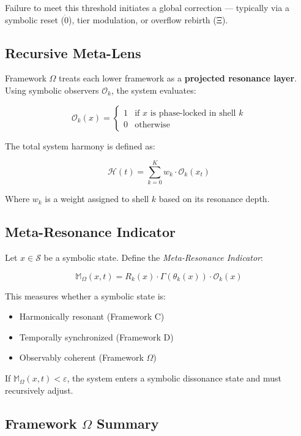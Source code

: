 Failure to meet this threshold initiates a global correction — typically via a symbolic reset ($\dot{0}$), tier modulation, or overflow rebirth (Ξ).

\subsection*{Recursive Meta-Lens}

Framework $\Omega$ treats each lower framework as a \textbf{projected resonance layer}. Using symbolic observers $\mathcal{O}_k$, the system evaluates:

\[
\mathcal{O}_k(x) = \begin{cases}
1 & \text{if } x \text{ is phase-locked in shell } k \\
0 & \text{otherwise}
\end{cases}
\]

The total system harmony is defined as:

\[
\mathcal{H}(t) = \sum_{k=0}^{K} w_k \cdot \mathcal{O}_k(x_t)
\]

Where $w_k$ is a weight assigned to shell $k$ based on its resonance depth.

\subsection*{Meta-Resonance Indicator}

Let $x \in \mathcal{S}$ be a symbolic state. Define the \emph{Meta-Resonance Indicator}:

\[
\mathbb{M}_\Omega(x, t) = R_k(x) \cdot \Gamma(\theta_k(x)) \cdot \mathcal{O}_k(x)
\]

This measures whether a symbolic state is:
\begin{itemize}
  \item Harmonically resonant (Framework C)
  \item Temporally synchronized (Framework D)
  \item Observably coherent (Framework $\Omega$)
\end{itemize}

If $\mathbb{M}_\Omega(x, t) < \varepsilon$, the system enters a symbolic dissonance state and must recursively adjust.

\subsection*{Framework $\Omega$ Summary}

